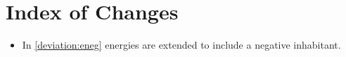 \section{Index of Changes}
\begin{itemize}
    \item In \ref{deviation:eneg} energies are extended to include a negative inhabitant. 
\end{itemize}